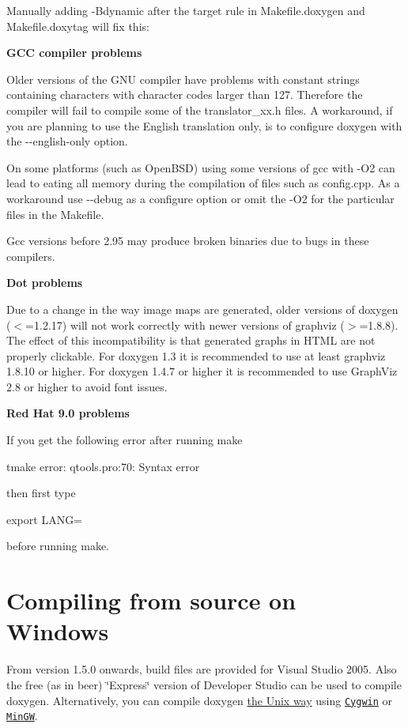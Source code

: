 Manually adding {\ttfamily -\/Bdynamic} after the target rule in {\ttfamily Makefile.doxygen} and {\ttfamily Makefile.doxytag} will fix this:



{\bfseries GCC compiler problems}

Older versions of the GNU compiler have problems with constant strings containing characters with character codes larger than 127. Therefore the compiler will fail to compile some of the translator\_\-xx.h files. A workaround, if you are planning to use the English translation only, is to configure doxygen with the {\ttfamily -\/-\/english-\/only} option.

On some platforms (such as OpenBSD) using some versions of gcc with -\/O2 can lead to eating all memory during the compilation of files such as config.cpp. As a workaround use -\/-\/debug as a configure option or omit the -\/O2 for the particular files in the Makefile.

Gcc versions before 2.95 may produce broken binaries due to bugs in these compilers.

{\bfseries Dot problems}

Due to a change in the way image maps are generated, older versions of doxygen ($<$=1.2.17) will not work correctly with newer versions of graphviz ($>$=1.8.8). The effect of this incompatibility is that generated graphs in HTML are not properly clickable. For doxygen 1.3 it is recommended to use at least graphviz 1.8.10 or higher. For doxygen 1.4.7 or higher it is recommended to use GraphViz 2.8 or higher to avoid font issues.

{\bfseries Red Hat 9.0 problems}

If you get the following error after running make \begin{DoxyVerb}
tmake error: qtools.pro:70: Syntax error
\end{DoxyVerb}
 then first type \begin{DoxyVerb}
export LANG=
\end{DoxyVerb}
 before running make.\hypertarget{install_install_src_windows}{}\section{Compiling from source on Windows}\label{install_install_src_windows}
From version 1.5.0 onwards, build files are provided for Visual Studio 2005. Also the free (as in beer) \char`\"{}Express\char`\"{} version of Developer Studio can be used to compile doxygen. Alternatively, you can compile doxygen \hyperlink{install_install_src_unix}{the Unix way} using \href{http://en.wikipedia.org/wiki/Cygwin}{\tt Cygwin} or \href{http://www.mingw.org/}{\tt MinGW}.

